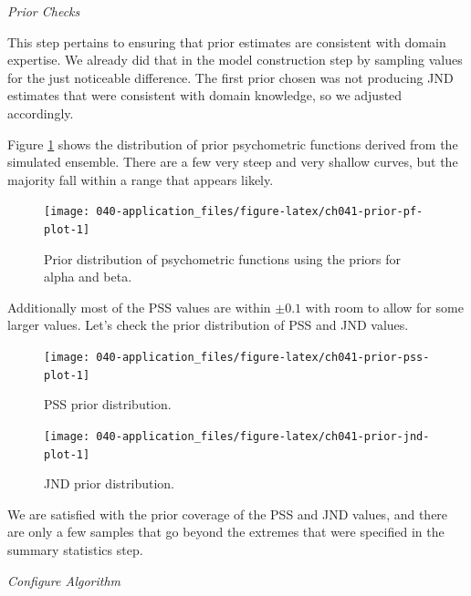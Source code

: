 \documentclass[11pt, oneside, openany]{scrbook}
\begin{document}

\emph{Prior Checks}

This step pertains to ensuring that prior estimates are consistent with domain expertise. We already did that in the model construction step by sampling values for the just noticeable difference. The first prior chosen was not producing JND estimates that were consistent with domain knowledge, so we adjusted accordingly.

Figure \ref{fig:ch041-prior-pf-plot} shows the distribution of prior psychometric functions derived from the simulated ensemble. There are a few very steep and very shallow curves, but the majority fall within a range that appears likely.

\begin{figure}

{\centering \texttt{[image: 040-application\_files/figure-latex/ch041-prior-pf-plot-1]} 

}

\caption{Prior distribution of psychometric functions using the priors for alpha and beta.}\label{fig:ch041-prior-pf-plot}
\end{figure}

Additionally most of the PSS values are within \(\pm 0.1\) with room to allow for some larger values. Let's check the prior distribution of PSS and JND values.

\begin{figure}

{\centering \texttt{[image: 040-application\_files/figure-latex/ch041-prior-pss-plot-1]} 

}

\caption{PSS prior distribution.}\label{fig:ch041-prior-pss-plot}
\end{figure}

\begin{figure}

{\centering \texttt{[image: 040-application\_files/figure-latex/ch041-prior-jnd-plot-1]} 

}

\caption{JND prior distribution.}\label{fig:ch041-prior-jnd-plot}
\end{figure}

We are satisfied with the prior coverage of the PSS and JND values, and there are only a few samples that go beyond the extremes that were specified in the summary statistics step.

\emph{Configure Algorithm}
\end{document}
